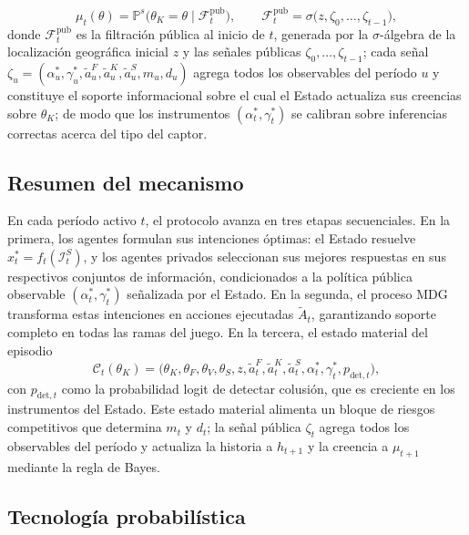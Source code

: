 \documentclass[review,authoryear,12pt]{elsarticle}
\theoremstyle{plain}
\theoremstyle{definition}
\newcommand{\Prob}{\mathbb{P}}
\newcommand{\1}{\mathbf{1}}
\begin{document}
\[
\mu_t(\theta)=\Prob^s\!\bigl(\theta_K=\theta\mid\mathcal{F}_t^{\mathrm{pub}}\bigr),\qquad \mathcal{F}_t^{\mathrm{pub}}=\sigma\bigl(z,\zeta_0,\ldots,\zeta_{t-1}\bigr),
\]
donde $\mathcal{F}_t^{\mathrm{pub}}$ es la filtración pública al inicio de $t$, generada por la $\sigma$-álgebra de la localización geográfica inicial $z$ y las señales públicas $\zeta_0,\ldots,\zeta_{t-1}$; cada señal $\zeta_u=(\alpha_u^\ast,\gamma_u^\ast,\tilde{a}_u^F,\tilde{a}_u^K,\tilde{a}_u^S,m_u,d_u)$ agrega todos los observables del período $u$ y constituye el soporte informacional sobre el cual el Estado actualiza sus creencias sobre $\theta_K$; de modo que los instrumentos $(\alpha_t^\ast,\gamma_t^\ast)$ se calibran sobre inferencias correctas acerca del tipo del captor.

\subsection{Resumen del mecanismo}\label{subsec:resumen-mecanismo}

En cada período activo $t$, el protocolo avanza en tres etapas secuenciales. En la primera, los agentes formulan sus intenciones óptimas: el Estado resuelve $x_t^\ast=f_t(\mathcal{I}_t^S)$, y los agentes privados seleccionan sus mejores respuestas en sus respectivos conjuntos de información, condicionados a la política pública observable $(\alpha_t^\ast,\gamma_t^\ast)$ señalizada por el Estado. En la segunda, el proceso MDG transforma estas intenciones en acciones ejecutadas $\tilde{A}_t$, garantizando soporte completo en todas las ramas del juego. En la tercera, el estado material del episodio
\[
\mathcal{C}_t(\theta_K)=\bigl(\theta_K,\theta_F,\theta_V,\theta_S,z,\tilde{a}_t^F,\tilde{a}_t^K,\tilde{a}_t^S,\alpha_t^\ast,\gamma_t^\ast,p_{\mathrm{det},t}\bigr),
\]
con $p_{\mathrm{det},t}$ como la probabilidad logit de detectar colusión, que es creciente en los instrumentos del Estado. Este estado material alimenta un bloque de riesgos competitivos que determina $m_t$ y $d_t$; la señal pública $\zeta_t$ agrega todos los observables del período y actualiza la historia a $h_{t+1}$ y la creencia a $\mu_{t+1}$ mediante la regla de Bayes.

\subsection{Tecnología probabilística}\label{subsec:prob-tech}
\end{document}

